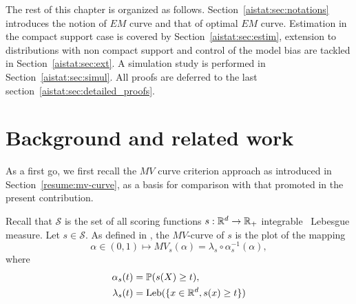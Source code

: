  The rest of this chapter is organized as follows. Section~\ref{aistat:sec:notations} introduces the notion of $EM$ curve and that of optimal $EM$
curve. Estimation in the compact support case is covered by Section~\ref{aistat:sec:estim}, extension to distributions with non compact support and
control of the model bias are tackled in Section~\ref{aistat:sec:ext}. A simulation study is
performed in Section~\ref{aistat:sec:simul}. All proofs are deferred to the
last section~\ref{aistat:sec:detailed_proofs}.   





\section{Background and related work} \label{aistat:sec:background}
As a first go, we first recall the $MV$ curve criterion approach as introduced in Section~\ref{resume:mv-curve},
as a basis
for comparison with that promoted in the present contribution.


Recall that $\mathcal{S}$ is the set of all scoring functions
$s: \mathbb{R}^d \rightarrow \mathbb{R}_+ $ integrable \wrt~Lebesgue
measure.
Let $s\in \mathcal{S}$. As defined in \cite{CLEM13,CLEM14}, the
$MV$-curve of $s$ is the plot of the mapping $$\alpha\in (0,1)\mapsto MV_s(\alpha) = \lambda_s \circ \alpha_s^{-1}(\alpha),$$
where 
\begin{equation}
\begin{aligned}
\label{aistat:eq:alpha}
\alpha_s(t) &= \mathbb{P}(s(X) \ge t),\\ 
\lambda_s(t) &=\text{Leb}(\{x \in \mathbb{R}^d, s(x) \ge t\})
  \end{aligned}
\end{equation}

